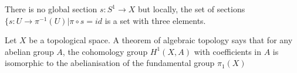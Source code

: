 There is no global section $s: S^1 \to X$ but locally, the set of sections $\{s: U \to \pi^{-1}(U) | \pi \circ s = id$ is a set with three elements.

Let $X$ be a topological space. A theorem of algebraic topology says that for any abelian group $A$, the cohomology group $H^1(X,A)$ with coefficients in $A$ is isomorphic to the abelianisation of the fundamental group $\pi_1(X)$
